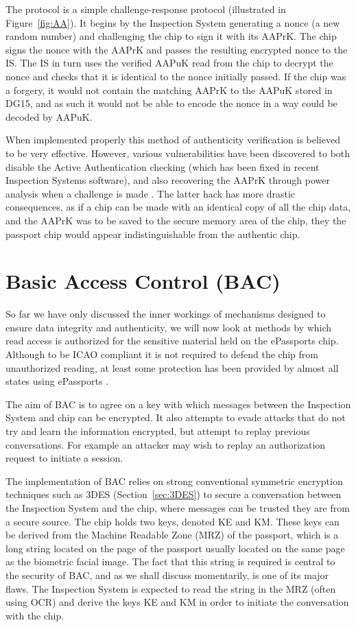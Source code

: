 \documentclass[12pt]{article}
\begin{document}
The protocol is a simple challenge-response protocol (illustrated in Figure~\ref{fig:AA}). It begins by the Inspection System generating a nonce (a new random number) and challenging the chip to sign it with its AAPrK. The chip signs the nonce with the AAPrK and passes the resulting encrypted nonce to the IS. The IS in turn uses the verified AAPuK read from the chip to decrypt the nonce and checks that it is identical to the nonce initially passed. If the chip was a forgery, it would not contain the matching AAPrK to the AAPuK stored in DG15, and as such it would not be able to encode the nonce in a way could be decoded by AAPuK. 

When implemented properly this method of authenticity verification is believed to be very effective. However, various vulnerabilities have been discovered to both disable the Active Authentication checking (which has been fixed in recent Inspection Systems software), and also recovering the AAPrK through power analysis when a challenge is made \cite{Witteman:2005ta}. The latter hack has more drastic consequences, as if a chip can be made with an identical copy of all the chip data, and the AAPrK was to be saved to the secure memory area of the chip, they the passport chip would appear indistinguishable from the authentic chip.

\section{Basic Access Control (BAC)}
\label{sec:BAC}
So far we have only discussed the inner workings of mechanisms designed to ensure data integrity and authenticity, we will now look at methods by which read access is authorized for the sensitive material held on the ePassports chip. Although to be ICAO compliant it is not required to defend the chip from unauthorized reading, at least some protection has been provided by almost all states using ePassports \cite{Chothia:2010wf}.

The aim of BAC is to agree on a key with which messages between the Inspection System and chip can be encrypted. It also attempts to evade attacks that do not try and learn the information encrypted, but attempt to replay previous conversations. For example an attacker may wish to replay an authorization request to initiate a session.

The implementation of BAC relies on strong conventional symmetric encryption techniques such as 3DES (Section~\ref{sec:3DES}) to secure a conversation between the Inspection System and the chip, where messages can be trusted they are from a secure source. The chip holds two keys, denoted KE and KM. These keys can be derived from the Machine Readable Zone (MRZ) of the passport, which is a long string located on the page of the passport usually located on the same page as the biometric facial image. The fact that this string is required is central to the security of BAC, and as we shall discuss momentarily, is one of its major flaws. The Inspection System is expected to read the string in the MRZ (often using OCR) and derive the keys KE and KM in order to initiate the conversation with the chip.
\end{document}
